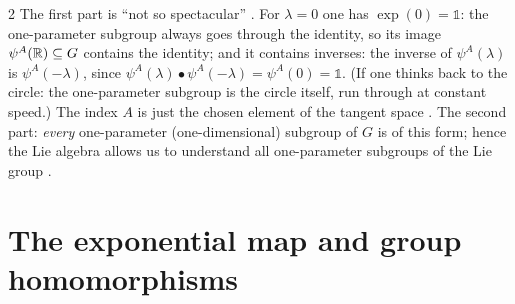 \begin{paracol}{2}
The first part is ``not so spectacular'' . For $\lambda=0$ one has $\exp(0)=\mathbb 1$: the one-parameter subgroup always goes through the identity, so its image $\psi^A(\mathbb{R})\subseteq G$ contains the identity; and it contains inverses: the inverse of $\psi^A(\lambda)$ is $\psi^A(-\lambda)$, since $\psi^A(\lambda)\bullet\psi^A(-\lambda)=\psi^A(0)=\mathbb 1$. (If one thinks back to the circle: the one-parameter subgroup is the circle itself, run through at constant speed.) The index $A$ is just the chosen element of the tangent space   . The second part: \emph{every} one-parameter (one-dimensional) subgroup of $G$ is of this form; hence the Lie algebra allows us to understand all one-parameter subgroups of the Lie group .

\section{The exponential map and group homomorphisms}\label{sec:rc-hom}


\end{paracol}
